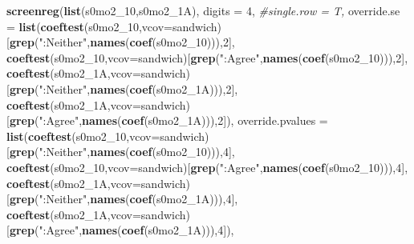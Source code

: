 \documentclass[
]{article}
\newenvironment{Shaded}{\begin{snugshade}}{\end{snugshade}}
\newcommand{\CommentTok}[1]{\textcolor[rgb]{0.56,0.35,0.01}{\textit{#1}}}
\newcommand{\DataTypeTok}[1]{\textcolor[rgb]{0.13,0.29,0.53}{#1}}
\newcommand{\DecValTok}[1]{\textcolor[rgb]{0.00,0.00,0.81}{#1}}
\newcommand{\KeywordTok}[1]{\textcolor[rgb]{0.13,0.29,0.53}{\textbf{#1}}}
\newcommand{\NormalTok}[1]{#1}
\newcommand{\StringTok}[1]{\textcolor[rgb]{0.31,0.60,0.02}{#1}}
\begin{document}
\begin{Shaded}
\begin{Highlighting}[]
\KeywordTok{screenreg}\NormalTok{(}\KeywordTok{list}\NormalTok{(s0mo2_}\DecValTok{10}\NormalTok{,s0mo2_1A), }\DataTypeTok{digits =} \DecValTok{4}\NormalTok{, }\CommentTok{#single.row = T,}
          \DataTypeTok{override.se =} \KeywordTok{list}\NormalTok{(}\KeywordTok{coeftest}\NormalTok{(s0mo2_}\DecValTok{10}\NormalTok{,}\DataTypeTok{vcov=}\NormalTok{sandwich)[}\KeywordTok{grep}\NormalTok{(}\StringTok{":Neither"}\NormalTok{,}\KeywordTok{names}\NormalTok{(}\KeywordTok{coef}\NormalTok{(s0mo2_}\DecValTok{10}\NormalTok{))),}\DecValTok{2}\NormalTok{],}
                             \KeywordTok{coeftest}\NormalTok{(s0mo2_}\DecValTok{10}\NormalTok{,}\DataTypeTok{vcov=}\NormalTok{sandwich)[}\KeywordTok{grep}\NormalTok{(}\StringTok{":Agree"}\NormalTok{,}\KeywordTok{names}\NormalTok{(}\KeywordTok{coef}\NormalTok{(s0mo2_}\DecValTok{10}\NormalTok{))),}\DecValTok{2}\NormalTok{],}
                             \KeywordTok{coeftest}\NormalTok{(s0mo2_1A,}\DataTypeTok{vcov=}\NormalTok{sandwich)[}\KeywordTok{grep}\NormalTok{(}\StringTok{":Neither"}\NormalTok{,}\KeywordTok{names}\NormalTok{(}\KeywordTok{coef}\NormalTok{(s0mo2_1A))),}\DecValTok{2}\NormalTok{],}
                             \KeywordTok{coeftest}\NormalTok{(s0mo2_1A,}\DataTypeTok{vcov=}\NormalTok{sandwich)[}\KeywordTok{grep}\NormalTok{(}\StringTok{":Agree"}\NormalTok{,}\KeywordTok{names}\NormalTok{(}\KeywordTok{coef}\NormalTok{(s0mo2_1A))),}\DecValTok{2}\NormalTok{]),}
          \DataTypeTok{override.pvalues =} \KeywordTok{list}\NormalTok{(}\KeywordTok{coeftest}\NormalTok{(s0mo2_}\DecValTok{10}\NormalTok{,}\DataTypeTok{vcov=}\NormalTok{sandwich)[}\KeywordTok{grep}\NormalTok{(}\StringTok{":Neither"}\NormalTok{,}\KeywordTok{names}\NormalTok{(}\KeywordTok{coef}\NormalTok{(s0mo2_}\DecValTok{10}\NormalTok{))),}\DecValTok{4}\NormalTok{],}
                                  \KeywordTok{coeftest}\NormalTok{(s0mo2_}\DecValTok{10}\NormalTok{,}\DataTypeTok{vcov=}\NormalTok{sandwich)[}\KeywordTok{grep}\NormalTok{(}\StringTok{":Agree"}\NormalTok{,}\KeywordTok{names}\NormalTok{(}\KeywordTok{coef}\NormalTok{(s0mo2_}\DecValTok{10}\NormalTok{))),}\DecValTok{4}\NormalTok{],}
                                  \KeywordTok{coeftest}\NormalTok{(s0mo2_1A,}\DataTypeTok{vcov=}\NormalTok{sandwich)[}\KeywordTok{grep}\NormalTok{(}\StringTok{":Neither"}\NormalTok{,}\KeywordTok{names}\NormalTok{(}\KeywordTok{coef}\NormalTok{(s0mo2_1A))),}\DecValTok{4}\NormalTok{],}
                                  \KeywordTok{coeftest}\NormalTok{(s0mo2_1A,}\DataTypeTok{vcov=}\NormalTok{sandwich)[}\KeywordTok{grep}\NormalTok{(}\StringTok{":Agree"}\NormalTok{,}\KeywordTok{names}\NormalTok{(}\KeywordTok{coef}\NormalTok{(s0mo2_1A))),}\DecValTok{4}\NormalTok{]),}

\end{Highlighting}
\end{Shaded}
\end{document}
